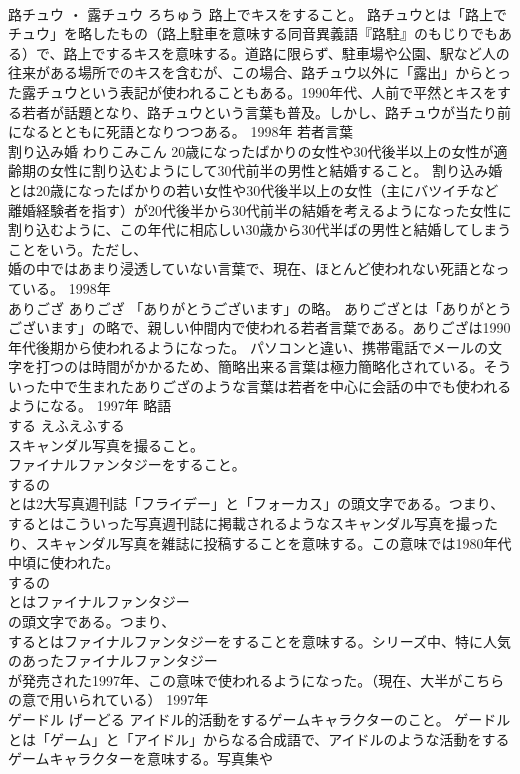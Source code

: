 \documentclass[8pt]{extreport}
\begin{document}
\begin{CJK}{UTF8}{min}
\\	路チュウ ・ 露チュウ	ろちゅう	路上でキスをすること。	路チュウとは「路上でチュウ」を略したもの（路上駐車を意味する同音異義語『路駐』のもじりでもある）で、路上でするキスを意味する。道路に限らず、駐車場や公園、駅など人の往来がある場所でのキスを含むが、この場合、路チュウ以外に「露出」からとった露チュウという表記が使われることもある。1990年代、人前で平然とキスをする若者が話題となり、路チュウという言葉も普及。しかし、路チュウが当たり前になるとともに死語となりつつある。	1998年	若者言葉	
\\	割り込み婚	わりこみこん	20歳になったばかりの女性や30代後半以上の女性が適齢期の女性に割り込むようにして30代前半の男性と結婚すること。	割り込み婚とは20歳になったばかりの若い女性や30代後半以上の女性（主にバツイチなど離婚経験者を指す）が20代後半から30代前半の結婚を考えるようになった女性に割り込むように、この年代に相応しい30歳から30代半ばの男性と結婚してしまうことをいう。ただし、
\\	婚の中ではあまり浸透していない言葉で、現在、ほとんど使われない死語となっている。	1998年	
\\	ありござ	ありござ	「ありがとうございます」の略。	ありござとは「ありがとうございます」の略で、親しい仲間内で使われる若者言葉である。ありござは1990年代後期から使われるようになった。 パソコンと違い、携帯電話でメールの文字を打つのは時間がかかるため、簡略出来る言葉は極力簡略化されている。そういった中で生まれたありござのような言葉は若者を中心に会話の中でも使われるようになる。	1997年	略語	
\\	する	えふえふする	
\\	スキャンダル写真を撮ること。 
\\	ファイナルファンタジーをすること。	
\\	するの
\\	とは2大写真週刊誌「フライデー」と「フォーカス」の頭文字である。つまり、
\\	するとはこういった写真週刊誌に掲載されるようなスキャンダル写真を撮ったり、スキャンダル写真を雑誌に投稿することを意味する。この意味では1980年代中頃に使われた。 
\\	するの
\\	とはファイナルファンタジー
\\	の頭文字である。つまり、
\\	するとはファイナルファンタジーをすることを意味する。シリーズ中、特に人気のあったファイナルファンタジー
\\	が発売された1997年、この意味で使われるようになった。（現在、大半がこちらの意で用いられている）	1997年	
\\	ゲードル	げーどる	アイドル的活動をするゲームキャラクターのこと。	ゲードルとは「ゲーム」と「アイドル」からなる合成語で、アイドルのような活動をするゲームキャラクターを意味する。写真集や

\end{CJK}
\end{document}
